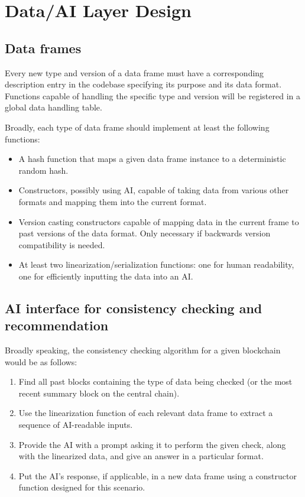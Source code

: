 \documentclass[12pt]{article}
\begin{document}
\section{Data/AI Layer Design}
\subsection{Data frames}
Every new type and version of a data frame must have a corresponding description entry in the codebase specifying its purpose and its data format. Functions capable of handling the specific type and version will be registered in a global data handling table.

Broadly, each type of data frame should implement at least the following functions:
\begin{itemize}
\item A hash function that maps a given data frame instance to a deterministic random hash.

\item Constructors, possibly using AI, capable of taking data from various other formats and mapping them into the current format.

\item Version casting constructors capable of mapping data in the current frame to past versions of the data format. Only necessary if backwards version compatibility is needed.

\item At least two linearization/serialization functions: one for human readability, one for efficiently inputting the data into an AI.
\end{itemize}


\subsection{AI interface for consistency checking and recommendation}
Broadly speaking, the consistency checking algorithm for a given blockchain would be as follows:
\begin{enumerate}
\item Find all past blocks containing the type of data being checked (or the most recent summary block on the central chain).

\item Use the linearization function of each relevant data frame to extract a sequence of AI-readable inputs.

\item Provide the AI with a prompt asking it to perform the given check, along with the linearized data, and give an answer in a particular format.

\item Put the AI's response, if applicable, in a new data frame using a constructor function designed for this scenario.
\end{enumerate}
\end{document}

